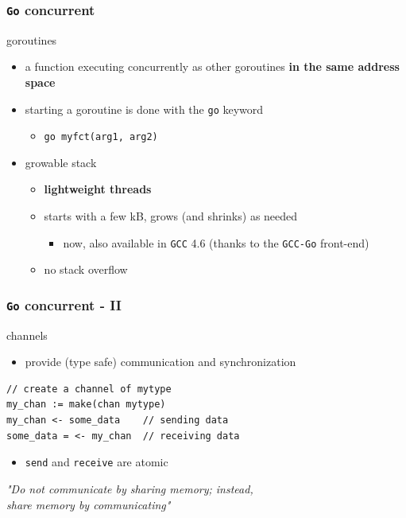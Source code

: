\documentclass[bigger]{beamer}
\providecommand{\alert}[1]{\textbf{#1}}
\begin{document}
\begin{frame}
\frametitle{\verb~Go~ concurrent}
\label{sec-1-10}
\begin{block}{goroutines}
\label{sec-1-10-1}


\begin{itemize}
\item a function executing concurrently as other goroutines \alert{in the same address space}
\item starting a goroutine is done with the \verb~go~ keyword
\begin{itemize}
\item \verb~go myfct(arg1, arg2)~
\end{itemize}
\item growable stack
\begin{itemize}
\item \alert{lightweight threads}
\item starts with a few kB, grows (and shrinks) as needed
\begin{itemize}
\item now, also available in \verb~GCC~ 4.6 (thanks to the \verb~GCC-Go~ front-end)
\end{itemize}
\item no stack overflow
\end{itemize}
\end{itemize}
\end{block}
\end{frame}
\begin{frame}[fragile]
\frametitle{\verb~Go~ concurrent - II}
\label{sec-1-11}
\begin{block}{channels}
\label{sec-1-11-1}


\begin{itemize}
\item provide (type safe) communication and synchronization
\end{itemize}


\begin{verbatim}
// create a channel of mytype
my_chan := make(chan mytype)
my_chan <- some_data    // sending data
some_data = <- my_chan  // receiving data
\end{verbatim}




\begin{itemize}
\item \verb~send~ and \verb~receive~ are atomic
\end{itemize}
\end{block}
\begin{alertblock}{\quad}
\label{sec-1-11-2}

 \begin{center}
 \emph{
 "Do not communicate by sharing memory; instead, \\
  share memory by communicating"
 }
 \end{center}
\end{alertblock}
\end{frame}
\end{document}
